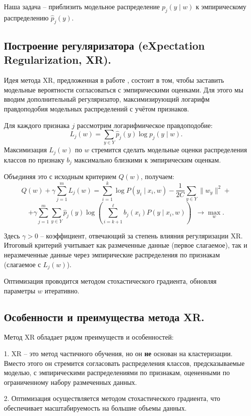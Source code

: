 Наша задача – приблизить модельное распределение $p_j(y \mid w)$ к эмпирическому распределению $\hat{p}_j(y)$.

\subsection{Построение регуляризатора (eXpectation Regularization, XR).}

Идея метода XR, предложенная в работе \cite{mann2007simple}, состоит в том, чтобы заставить модельные вероятности согласоваться с эмпирическими оценками. Для этого мы вводим дополнительный регуляризатор, максимизирующий логарифм правдоподобия модельных распределений с учётом признаков.

Для каждого признака $j$ рассмотрим логарифмическое правдоподобие:
\[
L_j(w) = \sum_{y \in Y} \hat{p}_j(y) \log p_j(y \mid w).
\]
Максимизация $L_j(w)$ по $w$ стремится сделать модельные оценки распределения классов по признаку $b_j$ максимально близкими к эмпирическим оценкам. 

Объединяя это с исходным критерием $Q(w)$, получаем:
\[
Q(w) + \gamma \sum_{j=1}^m L_j(w) = \sum_{i=1}^k \log P(y_i \mid x_i, w) 
- \frac{1}{2C}\sum_{y \in Y}\|w_y\|^2 +
\]
\[
+ \gamma \sum_{j=1}^m \sum_{y \in Y} \hat{p}_j(y)\log\left(\sum_{i=k+1}^{\ell} b_j(x_i)P(y \mid x_i, w)\right) \;\; \to \max_w.
\]

Здесь $\gamma > 0$ – коэффициент, отвечающий за степень влияния регуляризации XR. Итоговый критерий учитывает как размеченные данные (первое слагаемое), так и неразмеченные данные через эмпирические распределения по признакам (слагаемое с $L_j(w)$).

Оптимизация проводится методом стохастического градиента, обновляя параметры $w$ итеративно.

\subsection{Особенности и преимущества метода XR.}

Метод XR обладает рядом преимуществ и особенностей:

1. XR – это метод частичного обучения, но он \textbf{не} основан на кластеризации. Вместо этого он стремится согласовать распределения классов, предсказываемые моделью, с эмпирическими распределениями по признакам, оцененными по ограниченному набору размеченных данных.

2. Оптимизация осуществляется методом стохастического градиента, что обеспечивает масштабируемость на большие объемы данных.

